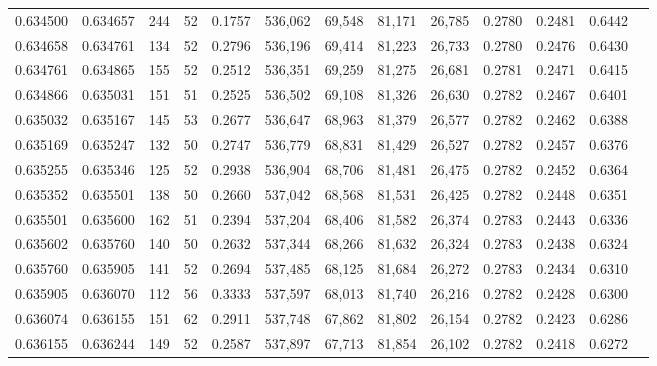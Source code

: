 \begin{tabular}{rrrrrrrrrrrrr}
0.634500 & 0.634657 &   244 &  52 &                                     0.1757 & 536,062 &  69,548 &  81,171 &  26,785 & 0.2780 & 0.2481 & 0.6442 \\
0.634658 & 0.634761 &   134 &  52 &                                     0.2796 & 536,196 &  69,414 &  81,223 &  26,733 & 0.2780 & 0.2476 & 0.6430 \\
0.634761 & 0.634865 &   155 &  52 &                                     0.2512 & 536,351 &  69,259 &  81,275 &  26,681 & 0.2781 & 0.2471 & 0.6415 \\
0.634866 & 0.635031 &   151 &  51 &                                     0.2525 & 536,502 &  69,108 &  81,326 &  26,630 & 0.2782 & 0.2467 & 0.6401 \\
0.635032 & 0.635167 &   145 &  53 &                                     0.2677 & 536,647 &  68,963 &  81,379 &  26,577 & 0.2782 & 0.2462 & 0.6388 \\
0.635169 & 0.635247 &   132 &  50 &                                     0.2747 & 536,779 &  68,831 &  81,429 &  26,527 & 0.2782 & 0.2457 & 0.6376 \\
0.635255 & 0.635346 &   125 &  52 &                                     0.2938 & 536,904 &  68,706 &  81,481 &  26,475 & 0.2782 & 0.2452 & 0.6364 \\
0.635352 & 0.635501 &   138 &  50 &                                     0.2660 & 537,042 &  68,568 &  81,531 &  26,425 & 0.2782 & 0.2448 & 0.6351 \\
0.635501 & 0.635600 &   162 &  51 &                                     0.2394 & 537,204 &  68,406 &  81,582 &  26,374 & 0.2783 & 0.2443 & 0.6336 \\
0.635602 & 0.635760 &   140 &  50 &                                     0.2632 & 537,344 &  68,266 &  81,632 &  26,324 & 0.2783 & 0.2438 & 0.6324 \\
0.635760 & 0.635905 &   141 &  52 &                                     0.2694 & 537,485 &  68,125 &  81,684 &  26,272 & 0.2783 & 0.2434 & 0.6310 \\
0.635905 & 0.636070 &   112 &  56 &                                     0.3333 & 537,597 &  68,013 &  81,740 &  26,216 & 0.2782 & 0.2428 & 0.6300 \\
0.636074 & 0.636155 &   151 &  62 &                                     0.2911 & 537,748 &  67,862 &  81,802 &  26,154 & 0.2782 & 0.2423 & 0.6286 \\
0.636155 & 0.636244 &   149 &  52 &                                     0.2587 & 537,897 &  67,713 &  81,854 &  26,102 & 0.2782 & 0.2418 & 0.6272 \\

\end{tabular}
